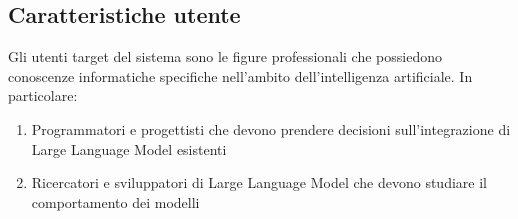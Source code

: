 
\subsection{Caratteristiche utente}
Gli utenti target del sistema sono le figure professionali che possiedono conoscenze informatiche specifiche nell'ambito dell'intelligenza artificiale.
In particolare:
\begin{enumerate}
    \item Programmatori e progettisti che devono prendere decisioni sull'integrazione di Large Language Model esistenti
    \item Ricercatori e sviluppatori di Large Language Model che devono studiare il comportamento dei modelli
\end{enumerate}  
